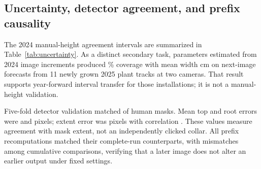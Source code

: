 \documentclass[review,12pt,authoryear]{elsarticle}
\begin{document}
\subsection{Uncertainty, detector agreement, and prefix causality}

The 2024 manual-height agreement intervals are summarized in Table~\ref{tab:uncertainty}. As a distinct secondary task, parameters estimated from 2024 image increments produced \UncertaintyTestCoverageNinetyFive{}\% coverage with mean width \UncertaintyTestWidthNinetyFive{} cm on \UncertaintyTestN{} next-image forecasts from 11 newly grown 2025 plant tracks at two cameras. That result supports year-forward interval transfer for those installations; it is not a manual-height validation.

\begin{table}[htbp]
\caption{Uncertainty evaluations. Coverage and width are reported together because nominal coverage alone can be achieved by uninformatively wide intervals.}
\label{tab:uncertainty}
\centering\small
{}
\end{table}

Five-fold detector validation matched \PixelMatched{} of \PixelInstances{} human masks. Mean top and root errors were \PixelTopMAEPx{} and \PixelRootMAEPx{} pixels; extent error was \PixelHeightMAEPx{} pixels with correlation \PixelHeightCorr{}. These values measure agreement with mask extent, not an independently clicked collar. All \CausalPrefixes{} prefix recomputations matched their complete-run counterparts, with \CausalMismatches{} mismatches among \CausalRows{} cumulative comparisons, verifying that a later image does not alter an earlier output under fixed settings.
\end{document}
